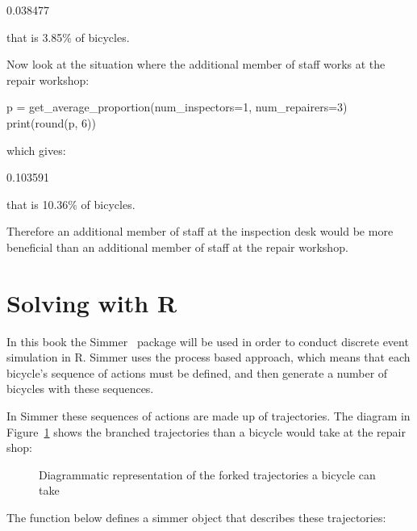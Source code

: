 \begin{pyout}
0.038477
\end{pyout}

that is 3.85\% of bicycles.

Now look at the situation where the additional member of staff works at the
repair workshop:

\begin{pyin}
p = get_average_proportion(num_inspectors=1, num_repairers=3)
print(round(p, 6))
\end{pyin}

which gives:

\begin{pyout}
0.103591
\end{pyout}

that is 10.36\% of bicycles.

Therefore an additional member of staff at the inspection desk would be more
beneficial than an additional member of staff at the repair workshop.


\section{Solving with R}\label{sec:discrete_event_simulation_solving-with-R}

In this book the Simmer~\cite{ucar2019simmer} package will be used
in order to conduct discrete event simulation in R. Simmer uses the process
based approach, which means that each bicycle's sequence of
actions must be defined, and then generate a number of bicycles with these
sequences.

In Simmer these sequences of actions are made up of trajectories. The
diagram in Figure~\ref{fig:processbased_diagram} shows the branched
trajectories than a bicycle would take at the repair shop:

\begin{figure}
\begin{center}

\caption{Diagrammatic representation of the forked trajectories a bicycle can take}
\label{fig:processbased_diagram}
\end{center}
\end{figure}

The function below defines a simmer object that describes these trajectories:

